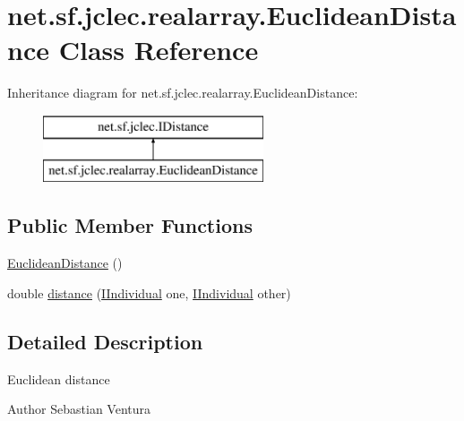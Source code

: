 \hypertarget{classnet_1_1sf_1_1jclec_1_1realarray_1_1_euclidean_distance}{\section{net.\-sf.\-jclec.\-realarray.\-Euclidean\-Distance Class Reference}
\label{classnet_1_1sf_1_1jclec_1_1realarray_1_1_euclidean_distance}
}
Inheritance diagram for net.\-sf.\-jclec.\-realarray.\-Euclidean\-Distance\-:\begin{figure}[H]
\begin{center}
\leavevmode
\includegraphics[height=2.000000cm]{classnet_1_1sf_1_1jclec_1_1realarray_1_1_euclidean_distance}
\end{center}
\end{figure}
\subsection*{Public Member Functions}
\begin{DoxyCompactItemize}
\item 
\hyperlink{classnet_1_1sf_1_1jclec_1_1realarray_1_1_euclidean_distance_af284caee3ce51b7b0e180100639c323d}{Euclidean\-Distance} ()
\item 
double \hyperlink{classnet_1_1sf_1_1jclec_1_1realarray_1_1_euclidean_distance_ace3d61ddf5512cb35d3d3a635e8e203e}{distance} (\hyperlink{interfacenet_1_1sf_1_1jclec_1_1_i_individual}{I\-Individual} one, \hyperlink{interfacenet_1_1sf_1_1jclec_1_1_i_individual}{I\-Individual} other)
\end{DoxyCompactItemize}


\subsection{Detailed Description}
Euclidean distance

\begin{DoxyAuthor}{Author}
Sebastian Ventura 
\end{DoxyAuthor}


